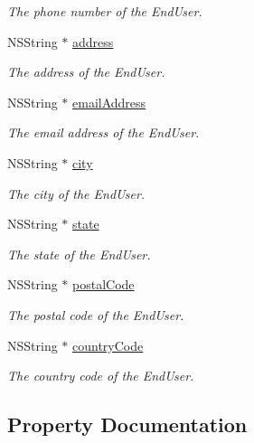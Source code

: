 \begin{DoxyCompactItemize}
\begin{DoxyCompactList}\small\item\em The phone number of the End\+User. \end{DoxyCompactList}\item 
N\+S\+String $\ast$ \hyperlink{class_x_i_end_user_info_af44bcace383116a5be0b0c1e40c7178d}{address}
\begin{DoxyCompactList}\small\item\em The address of the End\+User. \end{DoxyCompactList}\item 
N\+S\+String $\ast$ \hyperlink{class_x_i_end_user_info_a31c9f74ef89bb72c2681f2d023584766}{email\+Address}
\begin{DoxyCompactList}\small\item\em The email address of the End\+User. \end{DoxyCompactList}\item 
N\+S\+String $\ast$ \hyperlink{class_x_i_end_user_info_a9e98346fc5468f30109c8bb8fc3fa24c}{city}
\begin{DoxyCompactList}\small\item\em The city of the End\+User. \end{DoxyCompactList}\item 
N\+S\+String $\ast$ \hyperlink{class_x_i_end_user_info_aa1c7962d0b2d0e793dde50d8e4cb2978}{state}
\begin{DoxyCompactList}\small\item\em The state of the End\+User. \end{DoxyCompactList}\item 
N\+S\+String $\ast$ \hyperlink{class_x_i_end_user_info_a9d17baddb2a8dc5a664338fbb54eaa83}{postal\+Code}
\begin{DoxyCompactList}\small\item\em The postal code of the End\+User. \end{DoxyCompactList}\item 
N\+S\+String $\ast$ \hyperlink{class_x_i_end_user_info_a435ace275bece23753f62101469fa138}{country\+Code}
\begin{DoxyCompactList}\small\item\em The country code of the End\+User. \end{DoxyCompactList}\end{DoxyCompactItemize}


\subsection{Property Documentation}
\hypertarget{class_x_i_end_user_info_af44bcace383116a5be0b0c1e40c7178d}{}\label{class_x_i_end_user_info_af44bcace383116a5be0b0c1e40c7178d} 
